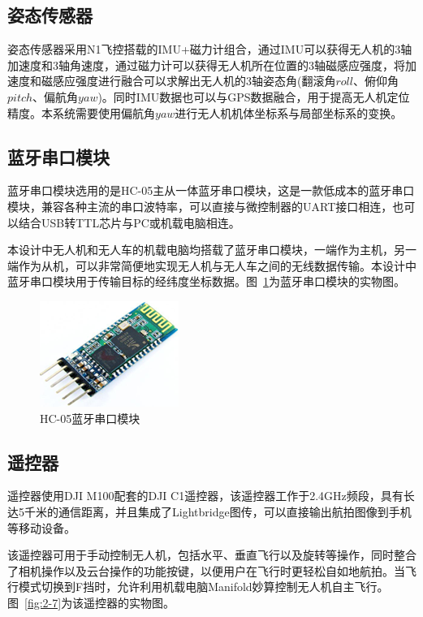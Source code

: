\subsection{姿态传感器}
姿态传感器采用N1飞控搭载的IMU+磁力计组合，通过IMU可以获得无人机的3轴加速度和3轴角速度，通过磁力计可以获得无人机所在位置的3轴磁感应强度，将加速度和磁感应强度进行融合可以求解出无人机的3轴姿态角(翻滚角$roll$、俯仰角$pitch$、偏航角$yaw$)。同时IMU数据也可以与GPS数据融合，用于提高无人机定位精度。本系统需要使用偏航角$yaw$进行无人机机体坐标系与局部坐标系的变换。

\subsection{蓝牙串口模块}
蓝牙串口模块选用的是HC-05主从一体蓝牙串口模块，这是一款低成本的蓝牙串口模块，兼容各种主流的串口波特率，可以直接与微控制器的UART接口相连，也可以结合USB转TTL芯片与PC或机载电脑相连。

本设计中无人机和无人车的机载电脑均搭载了蓝牙串口模块，一端作为主机，另一端作为从机，可以非常简便地实现无人机与无人车之间的无线数据传输。本设计中蓝牙串口模块用于传输目标的经纬度坐标数据。图~\ref{fig:2-6}为蓝牙串口模块的实物图。

\begin{figure}[htb]
	\centering
	\includegraphics[width=0.4\linewidth]{figures/2-6.png}
	\caption{HC-05蓝牙串口模块}
	\label{fig:2-6}
\end{figure}

\subsection{遥控器}
遥控器使用DJI M100配套的DJI C1遥控器，该遥控器工作于2.4GHz频段，具有长达5千米的通信距离，并且集成了Lightbridge图传，可以直接输出航拍图像到手机等移动设备。

该遥控器可用于手动控制无人机，包括水平、垂直飞行以及旋转等操作，同时整合了相机操作以及云台操作的功能按键，以便用户在飞行时更轻松自如地航拍。当飞行模式切换到F挡时，允许利用机载电脑Manifold妙算控制无人机自主飞行。图~\ref{fig:2-7}为该遥控器的实物图。

